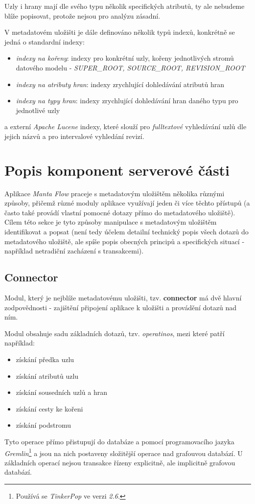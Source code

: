 Uzly i hrany mají dle svého typu několik specifických atributů, ty ale nebudeme blíže popisovat, protože nejsou pro analýzu zásadní.

V metadatovém uložišti je dále definováno několik typů indexů, konkrétně se jedná o standardní indexy:

\begin{itemize}
	\item{\textit{indexy na kořeny}}: indexy pro konkrétní uzly, kořeny jednotlivých stromů datového modelu - \textit{SUPER\_ROOT, SOURCE\_ROOT, REVISION\_ROOT}
	\item{\textit{indexy na atributy hran}}: indexy zrychlující dohledávání atributů hran
	\item{\textit{indexy na typy hran}}: indexy zrychlující dohledávání hran daného typu pro jednotlivé uzly
\end{itemize}

a externí \textit{Apache Lucene} indexy, které slouží pro \textit{fulltextové} vyhledávání uzlů dle jejich názvů a pro intervalové vyhledání revizí.


\section{Popis komponent serverové části}
\label{sec:ana_components}

Aplikace \textit{Manta Flow} praceje s metadatovým uložištěm několika různými způsoby, přičemž různé moduly aplikace využívají jeden či více těchto přístupů (a často také provádí vlastní pomocné dotazy přímo do metadatového uložiště). Cílem této sekce je tyto způsoby manipulace s metadatovým uložištěm identifikovat a popsat (není tedy účelem detailní technický popis všech dotazů do metadatového uložiště, ale spíše popis obecných principů a specifických situací - například netradiční zacházení s transakcemi).

\subsection{Connector}
\label{sec:ana_connector}
Modul, který je nejblíže metadatovému uložišti, tzv. \textbf{connector} má dvě hlavní zodpovědnosti - zajištění připojení aplikace k uložišti a provádění dotazů nad ním.

Modul obsahuje sadu základních dotazů, tzv. \textit{operatinos}, mezi které patří například:
\begin{itemize}
	\item{získání předka uzlu}
	\item{získání atributů uzlu}
	\item{získání sousedních uzlů a hran}
	\item{získání cesty ke kořeni}
	\item{získání podstromu}
\end{itemize}
Tyto operace přímo přistupují do databáze a pomocí programovacího jazyka \textit{Gremlin}\footnote{Používá se \textit{TinkerPop} ve verzi \textit{2.6}.} a jsou na nich postaveny složitější operace nad grafouvou databází. U základních operací nejsou transakce řízeny explicitně, ale implicitně grafovou databází.


